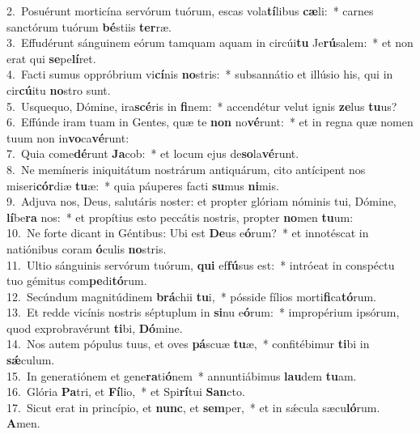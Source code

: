 {2.~}Posuérunt morticína servórum tuórum, escas vola\textbf{tí}libus \textbf{cæ}li:~* carnes sanctórum tuórum \textbf{bé}stiis \textbf{ter}ræ.\\
{3.~}Effudérunt sánguinem eórum tamquam aquam in circúi\textbf{tu} Je\textbf{rú}salem:~* et non erat qui \textbf{se}pe\textbf{lí}ret.\\
{4.~}Facti sumus oppróbrium vi\textbf{cí}nis \textbf{no}stris:~* subsannátio et illúsio his, qui in cir\textbf{cú}itu \textbf{no}stro sunt.\\
{5.~}Usquequo, Dómine, ira\textbf{scé}ris in \textbf{fi}nem:~* accendétur velut ignis \textbf{ze}lus \textbf{tu}us?\\
{6.~}Effúnde iram tuam in Gentes, quæ te \textbf{non} no\textbf{vé}runt:~* et in regna quæ nomen tuum non in\textbf{vo}ca\textbf{vé}runt:\\
{7.~}Quia come\textbf{dé}runt \textbf{Ja}cob:~* et locum ejus de\textbf{so}la\textbf{vé}runt.\\
{8.~}Ne memíneris iniquitátum nostrárum antiquárum, cito antícipent nos miseri\textbf{cór}diæ \textbf{tu}æ:~* quia páuperes facti \textbf{su}mus \textbf{ni}mis.\\
{9.~}Adjuva nos, Deus, salutáris noster: et propter glóriam nóminis tui, Dómine, \textbf{lí}be\textbf{ra} nos:~* et propítius esto peccátis nostris, propter \textbf{no}men \textbf{tu}um:\\
{10.~}Ne forte dicant in Géntibus: Ubi est \textbf{De}us e\textbf{ó}rum?~* et innotéscat in natiónibus coram \textbf{ó}culis \textbf{no}stris.\\
{11.~}Ultio sánguinis servórum tuórum, \textbf{qui} ef\textbf{fú}sus est:~* intróeat in conspéctu tuo gémitus com\textbf{pe}di\textbf{tó}rum.\\
{12.~}Secúndum magnitúdinem \textbf{brá}chii \textbf{tu}i,~* pósside fílios morti\textbf{fi}ca\textbf{tó}rum.\\
{13.~}Et redde vicínis nostris séptuplum in \textbf{si}nu e\textbf{ó}rum:~* impropérium ipsórum, quod exprobravérunt \textbf{ti}bi, \textbf{Dó}mine.\\
{14.~}Nos autem pópulus tuus, et oves \textbf{pá}scuæ \textbf{tu}æ,~* confitébimur \textbf{ti}bi in \textbf{sǽ}culum.\\
{15.~}In generatiónem et gene\textbf{ra}ti\textbf{ó}nem~* annuntiábimus \textbf{lau}dem \textbf{tu}am.\\
{16.~}Glória \textbf{Pa}tri, et \textbf{Fí}lio,~* et Spi\textbf{rí}tui \textbf{San}cto.\\
{17.~}Sicut erat in princípio, et \textbf{nunc}, et \textbf{sem}per,~* et in sǽcula sæcu\textbf{ló}rum. \textbf{A}men.\\
